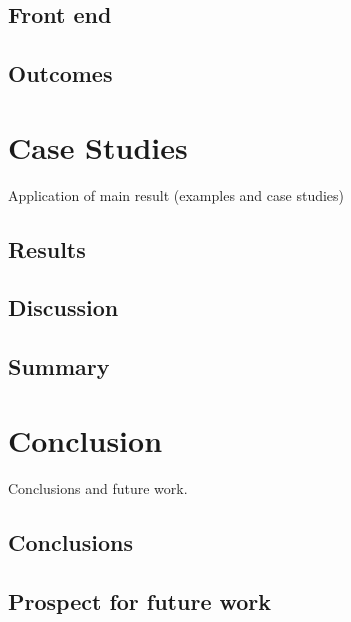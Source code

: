 \documentclass[
  oneside,
  11pt, a4paper,
  footinclude=true,
  headinclude=true,
  cleardoublepage=empty
]{scrbook}
\begin{document}
	\section{Front end}
	\section{Outcomes}


	\chapter{Case Studies}
	Application of main result (examples and case studies)
    	\section{Results}
    	\section{Discussion}
	\section{Summary}

	\chapter{Conclusion}
	Conclusions and future work.
	\section{Conclusions}
	\section{Prospect for future work}
			
	\cleardoublepage

	
\end{document}
